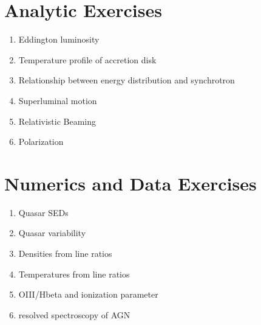 \section{Analytic Exercises}

\begin{enumerate}
\item Eddington luminosity
\item Temperature profile of accretion disk
\item Relationship between energy distribution and synchrotron
\item Superluminal motion
\item Relativistic Beaming
\item Polarization
\end{enumerate}

\section{Numerics and Data Exercises}

\begin{enumerate}
\item Quasar SEDs
\item Quasar variability
\item Densities from line ratios
\item Temperatures from line ratios
\item OIII/Hbeta and ionization parameter
\item resolved spectroscopy of AGN
\end{enumerate}


  
 
